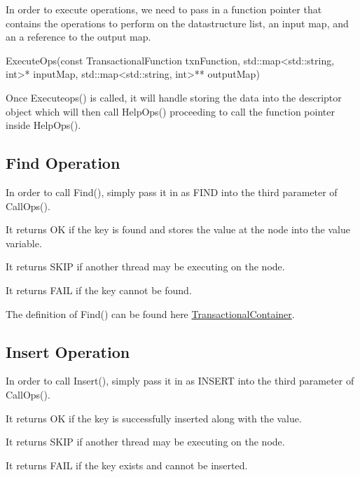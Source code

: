 In order to execute operations, we need to pass in a function pointer that contains the operations to perform on the datastructure list, an input map, and an a reference to the output map. 
\begin{DoxyCode}
ExecuteOps(\textcolor{keyword}{const} TransactionalFunction txnFunction, std::map<std::string, int>* inputMap, 
      std::map<std::string, int>** outputMap)
\end{DoxyCode}
 Once Executeops() is called, it will handle storing the data into the descriptor object which will then call Help\+Ops() proceeding to call the function pointer inside Help\+Ops().\hypertarget{index_using_Find}{}\subsection{Find Operation}\label{index_using_Find}
In order to call Find(), simply pass it in as F\+I\+ND into the third parameter of Call\+Ops().


\begin{DoxyItemize}
\item It returns OK if the key is found and stores the value at the node into the value variable.~\newline

\item It returns S\+K\+IP if another thread may be executing on the node.~\newline

\item It returns F\+A\+IL if the key cannot be found.~\newline

\end{DoxyItemize}

The definition of Find() can be found here \hyperlink{classTransactionalContainer}{Transactional\+Container}.\hypertarget{index_using_Insert}{}\subsection{Insert Operation}\label{index_using_Insert}
In order to call Insert(), simply pass it in as I\+N\+S\+E\+RT into the third parameter of Call\+Ops().


\begin{DoxyItemize}
\item It returns OK if the key is successfully inserted along with the value.~\newline

\item It returns S\+K\+IP if another thread may be executing on the node.~\newline

\item It returns F\+A\+IL if the key exists and cannot be inserted.~\newline

\end{DoxyItemize}

